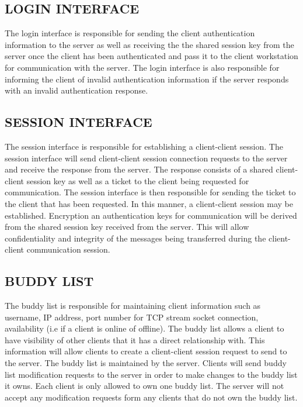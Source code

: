 \documentclass[twoside,letterpaper]{article}
\begin{document}
\bigskip

\subsection{LOGIN INTERFACE}
The login interface is responsible for sending the client authentication information to the server as well as
receiving the the shared session key from the server once the client has been authenticated and pass it to the client workstation for communication with the server. The login interface is also responsible for informing the
client of invalid authentication information if the server responds with an invalid authentication response.

\bigskip
 
\subsection{SESSION INTERFACE}
The session interface is responsible for establishing a client-client session. The session interface will send
client-client session connection requests to the server and receive the response from the server. The response
consists of a shared client-client session key as well as a ticket to the client being requested for
communication. The session interface is then responsible for sending the ticket to the client that has been
requested. In this manner, a client-client session may be established. Encryption an authentication keys for
communication will be derived from the shared session key received from the server. This will allow
confidentiality and integrity of the messages being transferred during the client-client communication session.

\bigskip
 
\subsection{BUDDY LIST}
The buddy list is responsible for maintaining client information such as username, IP address, port number for
TCP stream socket connection, availability (i.e if a client is online of offline). The buddy list allows a client to
have visibility of other clients that it has a direct relationship with. This information will allow clients to create
a client-client session request to send to the server. The buddy list is maintained by the server. Clients will send
buddy list modification requests to the server in order to make changes to the buddy list it owns. Each client
is only allowed to own one buddy list. The server will not accept any modification requests form any clients that
do not own the buddy list.
\bigskip
\end{document}
